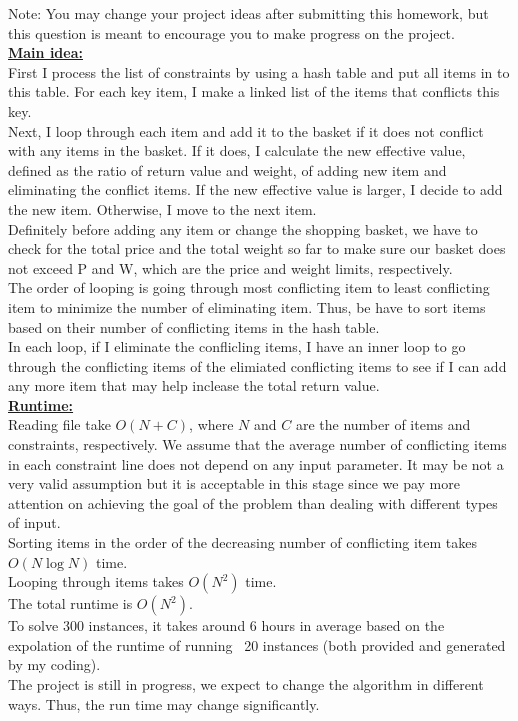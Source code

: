 \documentclass{article}\usepackage[utf8]{inputenc}\usepackage[margin=0.4cm,top=0.4cm,bottom=0.4cm]{geometry}\usepackage[usenames,dvipsnames,svgnames,table]{xcolor}
\begin{document}
\vspace{4pt}\noindent Note: You may change your project ideas after submitting this homework, but this question is meant to encourage you to make progress on the project.
\BeginSolution %
\\
\underline{\textbf{Main idea:}}
\\
First I process the list of constraints by using a hash table and put all items in to this table. For each key item, I make a linked list of the items that conflicts this key.\\
Next, I loop through each item and add it to the basket if it does not conflict with any items in the basket. If it does, I calculate the new effective value, defined as the ratio of return value and weight, of adding new item and eliminating the conflict items. If the new effective value is larger, I decide to add the new item. Otherwise, I move to the next item. \\
Definitely before adding any item or change the shopping basket, we have to check for the total price and the total weight so far to make sure our basket does not exceed P and W, which are the price and weight limits, respectively.\\
The order of looping is going through most conflicting item to least conflicting item to minimize the number of eliminating item. Thus, be have to sort items based on their number of conflicting items in the hash table.\\
In each loop, if I eliminate the conflicling items, I have an inner loop to go through the conflicting items of the elimiated conflicting items to see if I can add any more item that may help inclease the total return value.\\
\underline{\textbf{Runtime:}}
\\
Reading file take $O(N+C)$, where $N$ and $C$ are the number of items and constraints, respectively. We assume that the average number of conflicting items in each constraint line does not depend on any input parameter. It may be not a very valid assumption but it is acceptable in this stage since we pay more attention on achieving the goal of the problem than dealing with different types of input.\\
Sorting items in the order of the decreasing number of conflicting item takes $O(N\log N)$ time.\\
Looping through items takes $O(N^2)$ time.\\
The total runtime is $O(N^2)$.\\
To solve 300 instances, it takes around 6 hours in average based on the expolation of the runtime of running ~20 instances (both provided and generated by my coding).\\
The project is still in progress, we expect to change the algorithm in different ways. Thus, the run time may change significantly.
\EndSolution
\clearpage
\end{document}
